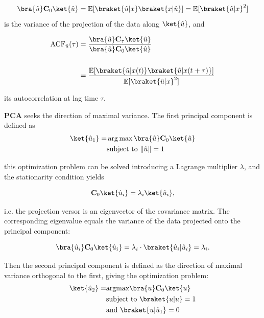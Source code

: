 \begin{equation}
    \bra{\hat{u}}\mathbf{C}_0\ket{\hat{u}} = \mathbb{E}[\braket{\hat{u}|x}\braket{x|\hat{u}}] = \mathbb{E}[\braket{\hat{u}|x}^2]
\end{equation}
is the variance of the projection of the data along $\ket{\hat{u}}$, and

\begin{align}
    \label{eq:autocorrelation}
    \textrm{ACF}_{\hat{u}}(\tau) &=\frac{\bra{\hat{u}}\mathbf{C}_{\tau}\ket{\hat{u}}}{\bra{\hat{u}}\mathbf{C}_{0}\ket{\hat{u}}} \notag \\
    \\ &= \frac{\mathbb{E}[\braket{\hat{u}|x(t)}\braket{\hat{u}|x(t+\tau)}]}{\mathbb{E}[\braket{\hat{u}|x}^2]} \notag 
\end{align}

its autocorrelation at lag time $\tau$.

\vspace{0.5em}

\noindent \textbf{PCA} seeks the direction of maximal variance. The first principal component is defined as
\begin{align}
\ket{\hat{u}_1} =& \arg\max \bra{\hat{u}}\mathbf{C}_0\ket{\hat{u}}  \notag \\
&\text{subject to}\,\,\|\hat{u}\|=1
\end{align}

this optimization problem can be solved introducing a Lagrange multiplier $\lambda$, and the stationarity condition yields

\begin{equation}
\mathbf{C}_0 \ket{\hat{u}_i} =\lambda_i \ket{\hat{u}_i},
\end{equation}

i.e. the projection versor is an eigenvector of the covariance matrix. The corresponding eigenvalue equals the variance of the data projected onto the principal component:

\begin{equation*}
\bra{\hat{u}_i}\mathbf{C}_0\ket{\hat{u}_i} = \lambda_i \cdot \braket{\hat{u}_i|\hat{u}_i} = \lambda_i.
\end{equation*}

Then the second principal component is defined as the direction of maximal variance orthogonal to the first, giving the 
optimization problem:
\begin{align}
\ket{\hat{u}_2} = &\text{argmax}\bra{u}\mathbf{C}_0\ket{u} \notag \\
&\text{subject to}  \,\, \braket{u|u} = 1 \notag \\
&\text{and}   \,\, \braket{u|\hat{u}_1} = 0
\end{align}

